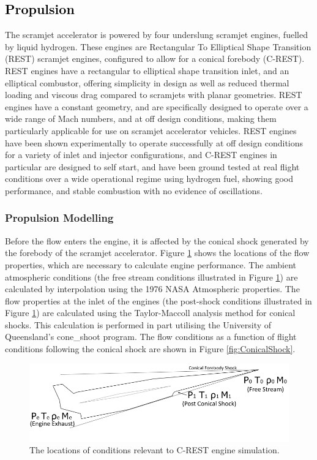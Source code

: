 \textcolor{black}{
\subsection{Propulsion}\label{sec:propulsion}
}
\noindent
The scramjet accelerator is powered by four underslung scramjet engines, fuelled by liquid hydrogen. These engines are Rectangular To Elliptical Shape Transition (REST) scramjet engines, configured to allow for a conical forebody (C-REST). REST engines have a rectangular to elliptical shape transition inlet, and an elliptical combustor\cite{Smart1999}, offering simplicity in design as well as reduced thermal loading and viscous drag compared to scramjets with planar geometries\cite{Suraweera2009}.  REST engines have a constant geometry, and are specifically designed to operate over a wide range of Mach numbers, and at off design conditions, making them particularly applicable for use on scramjet accelerator vehicles. REST engines have been shown experimentally to operate successfully at off design conditions for a variety of inlet and injector configurations\cite{Smart2006,Smart2009b}, and C-REST engines in particular are designed to self start\cite{Smart2012}, and have been ground tested at real flight conditions over a wide operational regime using hydrogen fuel, showing good performance, and stable combustion with no evidence of oscillations\cite{Whitside,Turner,Barth,Curran}.



\subsubsection{Propulsion Modelling}\label{sec:Propulsion}
Before the flow enters the engine, it is affected by the conical shock generated by the forebody of the scramjet accelerator.
Figure \ref{fig:SPARTANEngineshock} shows the locations of the flow properties, which are necessary to calculate engine performance. The ambient atmospheric conditions (the free stream conditions illustrated in Figure \ref{fig:SPARTANEngineshock}) are calculated by interpolation using the 1976 NASA Atmospheric properties\cite{Administration1976}.
The flow properties at the inlet of the engines (the post-shock conditions illustrated in Figure \ref{fig:SPARTANEngineshock}) are calculated using the Taylor-Maccoll analysis method for conical shocks\cite{TaylorMaccoll}. This calculation is performed in part utilising the University of Queensland's \textsf{cone\_shoot} program. The flow conditions as a function of flight conditions following the conical shock are shown in Figure \ref{fig:ConicalShock}.  
\begin{figure}[ht]
	\centering
	\includegraphics[width=0.7\linewidth]{figures/3_vehicle_design/SPARTANEngineshock}
	\caption{The locations of conditions relevant to C-REST engine simulation. }
	\label{fig:SPARTANEngineshock}
\end{figure}

